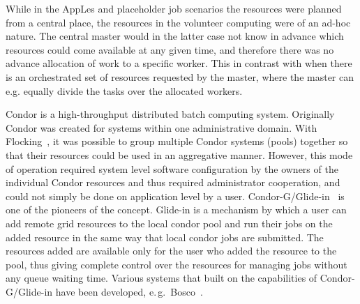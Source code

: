 \documentclass{sig-alternate}
\begin{document}
While in the AppLes and placeholder job scenarios the resources were planned
from a central place, the resources in the volunteer computing were of an
ad-hoc nature.
The central master would in the latter case not know in advance which resources
could come available at any given time, and therefore there was no advance
allocation of work to a specific worker.
This in contrast with when there is an orchestrated set of resources requested
by the master, where the master can e.g. equally divide the tasks
over the allocated workers.

Condor is a high-throughput distributed batch computing system.
Originally Condor was created for systems within one administrative domain.
With Flocking~\cite{Epema:1996:flocking}, it was possible to group multiple
Condor systems (pools) together so that their resources could be used in an
aggregative manner.
However, this mode of operation required system level software configuration by
the owners of the individual Condor resources and thus required administrator
cooperation, and could not simply be done on application level by a user.
Condor-G/Glide-in~\cite{condor-g} is one of the pioneers of the \pilotjob
concept.
Glide-in is a mechanism by which a user can add remote grid resources to the
local condor pool and run their jobs on the added resource in the same way that
local condor jobs are submitted.
The resources added are available only for the user who added the resource to
the pool, thus giving complete control over the resources for managing jobs
without any queue waiting time.
Various systems that built on the \pilot capabilities of Condor-G/Glide-in have
been developed, e.\,g.\ Bosco~\cite{bosco}.


\end{document}
